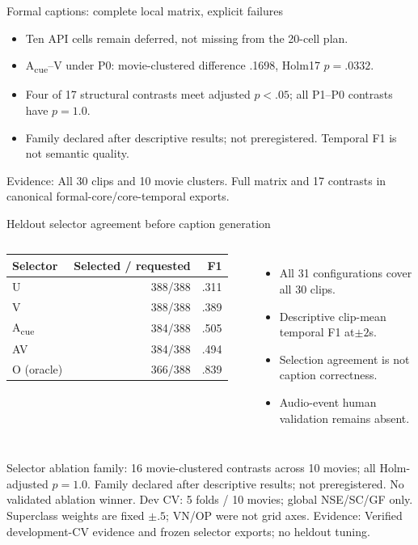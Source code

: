 \documentclass[aspectratio=169,11pt]{beamer}
\newcommand{\Acue}{A\textsubscript{cue}}
\newcommand{\source}[1]{\vfill{\tiny\color{gray}Evidence: #1}}
\begin{document}
\begin{frame}{Formal captions: complete local matrix, explicit failures}
\centering\small

\vspace{4mm}
\begin{itemize}
\item Ten API cells remain deferred, not missing from the 20-cell plan.
\item \Acue{}--V under P0: movie-clustered difference .1698, Holm17 $p=.0332$.
\item Four of 17 structural contrasts meet adjusted $p<.05$; all P1--P0 contrasts have $p=1.0$.
\item Family declared after descriptive results; not preregistered. Temporal F1 is not semantic quality.
\end{itemize}
\source{All 30 clips and 10 movie clusters. Full matrix and 17 contrasts in canonical formal-core/core-temporal exports.}
\end{frame}

\begin{frame}{Heldout selector agreement before caption generation}
\begin{columns}[T]
\centering
\begin{tabular}{lrr}
\toprule Selector & Selected / requested & F1 \\
\midrule U & 388/388 & .311 \\
V & 388/388 & .389 \\
\Acue{} & 384/388 & .505 \\
AV & 384/388 & .494 \\
O (oracle) & 366/388 & .839 \\
\bottomrule
\end{tabular}
\begin{itemize}
\item All 31 configurations cover all 30 clips.
\item Descriptive clip-mean temporal F1 at$\pm2$s.
\item Selection agreement is not caption correctness.
\item Audio-event human validation remains absent.
\end{itemize}
\end{columns}
\vspace{4mm}
\small Selector ablation family: 16 movie-clustered contrasts across 10 movies; all Holm-adjusted $p=1.0$. Family declared after descriptive results; not preregistered. No validated ablation winner.
\vspace{2mm}\small Dev CV: 5 folds / 10 movies; global NSE/SC/GF only. Superclass weights are fixed $\pm.5$; VN/OP were not grid axes.
\source{Verified development-CV evidence and frozen selector exports; no heldout tuning.}
\end{frame}
\end{document}
